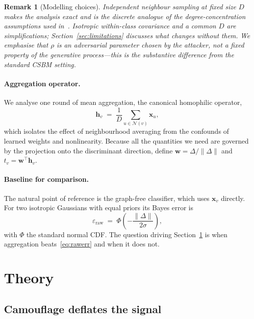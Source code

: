 \documentclass[onecolumn,pdflatex,sn-basic,Numbered]{sn-jnl}
\theoremstyle{thmstyleone}
\theoremstyle{thmstylethree}
\newtheorem{remark}[theorem]{Remark}
\begin{document}
\begin{remark}[Modelling choices]
Independent neighbour sampling at fixed size $D$ makes the analysis exact and is
the discrete analogue of the degree-concentration assumptions used
in~\citep{baranwal2021graph}. Isotropic within-class covariance and a common $D$ are
simplifications; Section~\ref{sec:limitations} discusses what changes without them.
We emphasise that $\rho$ is an \emph{adversarial} parameter chosen by the attacker,
not a fixed property of the generative process---this is the substantive
difference from the standard CSBM setting.
\end{remark}

\paragraph{Aggregation operator.}
We analyse one round of mean aggregation, the canonical homophilic operator,
\begin{equation}
    \mathbf{h}_v \;=\; \frac{1}{D}\sum_{u \in \mathcal{N}(v)} \mathbf{x}_u ,
    \label{eq:meanagg}
\end{equation}
which isolates the effect of neighbourhood averaging from the confounds of learned
weights and nonlinearity. Because all the quantities we need are governed by the
projection onto the discriminant direction, define
$\mathbf{w} = \Delta/\|\Delta\|$ and $t_v = \mathbf{w}^\top \mathbf{h}_v$.

\paragraph{Baseline for comparison.}
The natural point of reference is the graph-free classifier, which uses
$\mathbf{x}_v$ directly. For two isotropic Gaussians with equal priors its Bayes
error is
\begin{equation}
    \varepsilon_{\mathrm{raw}} \;=\; \Phi\!\left(-\frac{\|\Delta\|}{2\sigma}\right),
    \label{eq:rawerr}
\end{equation}
with $\Phi$ the standard normal CDF. The question driving Section~\ref{sec:theory}
is when aggregation beats~\eqref{eq:rawerr} and when it does not.



\section{Theory}
\label{sec:theory}

\subsection{Camouflage deflates the signal}
\end{document}
